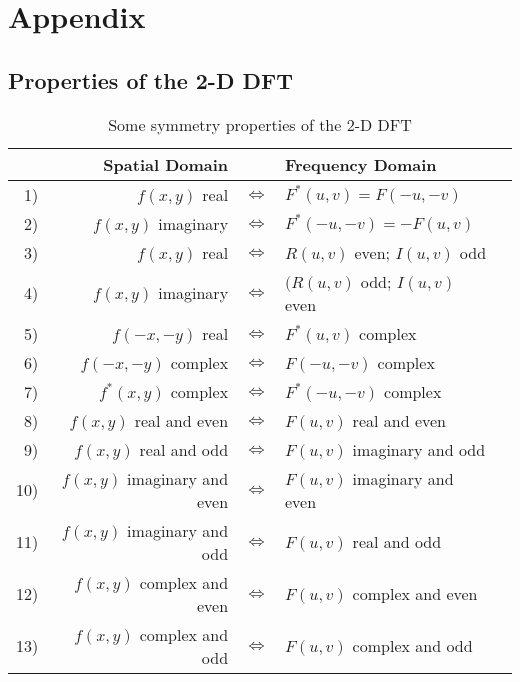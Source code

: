 \appendix
{}
\section{Appendix}
\subsection{Properties of the 2-D DFT}


\begin{table}[htbp]
	\centering
	\begin{tabular}{|rrllp{0.1cm}|}
	\hline
	& \textbf{Spatial Domain} & & \textbf{Frequency Domain} & \\ \hline
	1) & $f(x,y)$ real & $\Leftrightarrow$ & $F^*(u,v) = F(-u,-v)$ & \\
	2) & $f(x,y)$ imaginary & $\Leftrightarrow$ & $F^*(-u,-v) = -F(u,v)$ & \\
	3) & $f(x,y)$ real & $\Leftrightarrow$ & $R(u,v)$ even; $I(u,v)$ odd & \\
	4) & $f(x,y)$ imaginary & $\Leftrightarrow$ & $(R(u,v)$ odd; $I(u,v)$ even & \\
	5) & $f(-x,-y)$ real & $\Leftrightarrow$ & $F^*(u,v)$ complex & \\
	6) & $f(-x,-y)$ complex & $\Leftrightarrow$ & $F(-u,-v)$ complex & \\
	7) & $f^*(x,y)$ complex & $\Leftrightarrow$ & $F^*(-u,-v)$ complex & \\
	8) & $f(x,y)$ real and even & $\Leftrightarrow$ & $F(u,v)$ real and even & \\
	9) & $f(x,y)$ real and odd & $\Leftrightarrow$ & $F(u,v)$ imaginary and odd & \\
	10) & $f(x,y)$ imaginary and even & $\Leftrightarrow$ & $F(u,v)$ imaginary and even & \\
	11) & $f(x,y)$ imaginary and odd & $\Leftrightarrow$ & $F(u,v)$ real and odd & \\
	12) & $f(x,y)$ complex and even & $\Leftrightarrow$ & $F(u,v)$ complex and even & \\
	13) & $f(x,y)$ complex and odd & $\Leftrightarrow$ & $F(u,v)$ complex and odd & \\
	\hline
	\end{tabular}
	\caption{Some symmetry properties of the 2-D DFT}
	\label{tab:Symmetry_2D_DFT}
\end{table}

